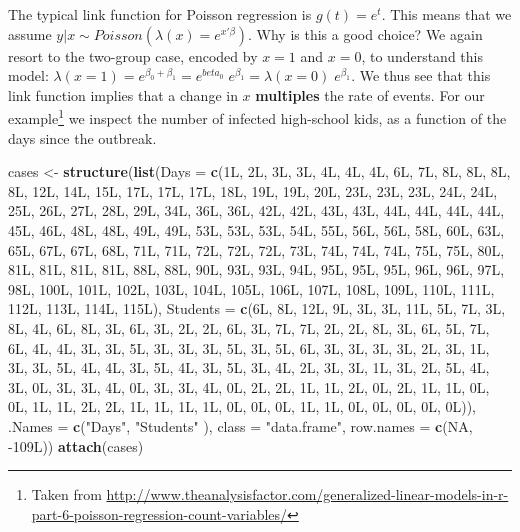 \documentclass[]{book}
\newenvironment{Shaded}{\begin{snugshade}}{\end{snugshade}}
\newcommand{\KeywordTok}[1]{\textcolor[rgb]{0.13,0.29,0.53}{\textbf{{#1}}}}
\newcommand{\DataTypeTok}[1]{\textcolor[rgb]{0.13,0.29,0.53}{{#1}}}
\newcommand{\StringTok}[1]{\textcolor[rgb]{0.31,0.60,0.02}{{#1}}}
\newcommand{\OtherTok}[1]{\textcolor[rgb]{0.56,0.35,0.01}{{#1}}}
\newcommand{\NormalTok}[1]{{#1}}
\theoremstyle{definition}
\theoremstyle{definition}
\theoremstyle{remark}
\begin{document}
The typical link function for Poisson regression is \(g(t)=e^t\). This
means that we assume \(y|x \sim Poisson(\lambda(x) = e^{x'\beta})\). Why
is this a good choice? We again resort to the two-group case, encoded by
\(x=1\) and \(x=0\), to understand this model:
\(\lambda(x=1)=e^{\beta_0+\beta_1}=e^{beta_0} \; e^{\beta_1}= \lambda(x=0) \; e^{\beta_1}\).
We thus see that this link function implies that a change in \(x\)
\textbf{multiples} the rate of events. For our example\footnote{Taken
  from
  \url{http://www.theanalysisfactor.com/generalized-linear-models-in-r-part-6-poisson-regression-count-variables/}}
we inspect the number of infected high-school kids, as a function of the
days since the outbreak.

\begin{Shaded}
\begin{Highlighting}[]
\NormalTok{cases <-}\StringTok{  }
\KeywordTok{structure}\NormalTok{(}\KeywordTok{list}\NormalTok{(}\DataTypeTok{Days =} \KeywordTok{c}\NormalTok{(1L, 2L, 3L, 3L, 4L, 4L, 4L, 6L, 7L, 8L, }
\NormalTok{8L, 8L, 8L, 12L, 14L, 15L, 17L, 17L, 17L, 18L, 19L, 19L, 20L, }
\NormalTok{23L, 23L, 23L, 24L, 24L, 25L, 26L, 27L, 28L, 29L, 34L, 36L, 36L, }
\NormalTok{42L, 42L, 43L, 43L, 44L, 44L, 44L, 44L, 45L, 46L, 48L, 48L, 49L, }
\NormalTok{49L, 53L, 53L, 53L, 54L, 55L, 56L, 56L, 58L, 60L, 63L, 65L, 67L, }
\NormalTok{67L, 68L, 71L, 71L, 72L, 72L, 72L, 73L, 74L, 74L, 74L, 75L, 75L, }
\NormalTok{80L, 81L, 81L, 81L, 81L, 88L, 88L, 90L, 93L, 93L, 94L, 95L, 95L, }
\NormalTok{95L, 96L, 96L, 97L, 98L, 100L, 101L, 102L, 103L, 104L, 105L, }
\NormalTok{106L, 107L, 108L, 109L, 110L, 111L, 112L, 113L, 114L, 115L), }
    \DataTypeTok{Students =} \KeywordTok{c}\NormalTok{(6L, 8L, 12L, 9L, 3L, 3L, 11L, 5L, 7L, 3L, 8L, }
    \NormalTok{4L, 6L, 8L, 3L, 6L, 3L, 2L, 2L, 6L, 3L, 7L, 7L, 2L, 2L, 8L, }
    \NormalTok{3L, 6L, 5L, 7L, 6L, 4L, 4L, 3L, 3L, 5L, 3L, 3L, 3L, 5L, 3L, }
    \NormalTok{5L, 6L, 3L, 3L, 3L, 3L, 2L, 3L, 1L, 3L, 3L, 5L, 4L, 4L, 3L, }
    \NormalTok{5L, 4L, 3L, 5L, 3L, 4L, 2L, 3L, 3L, 1L, 3L, 2L, 5L, 4L, 3L, }
    \NormalTok{0L, 3L, 3L, 4L, 0L, 3L, 3L, 4L, 0L, 2L, 2L, 1L, 1L, 2L, 0L, }
    \NormalTok{2L, 1L, 1L, 0L, 0L, 1L, 1L, 2L, 2L, 1L, 1L, 1L, 1L, 0L, 0L, }
    \NormalTok{0L, 1L, 1L, 0L, 0L, 0L, 0L, 0L)), }\DataTypeTok{.Names =} \KeywordTok{c}\NormalTok{(}\StringTok{"Days"}\NormalTok{, }\StringTok{"Students"}
\NormalTok{), }\DataTypeTok{class =} \StringTok{"data.frame"}\NormalTok{, }\DataTypeTok{row.names =} \KeywordTok{c}\NormalTok{(}\OtherTok{NA}\NormalTok{, -109L))}
\KeywordTok{attach}\NormalTok{(cases)}
\end{Highlighting}
\end{Shaded}
\end{document}
